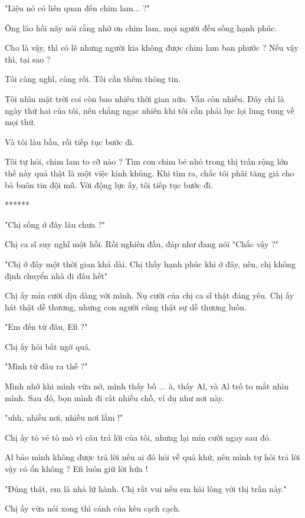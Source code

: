 "Liệu nó có liên quan đến chim lam... ?"

Ông lão hồi nãy nói rằng nhờ ơn chim lam, mọi người đều sống hạnh phúc.

Cho là vậy, thì có lẽ nhưng người kia không được chim lam ban phước ? Nếu vậy thì, tại sao ?

Tôi càng nghĩ, càng rối. Tôi cần thêm thông tin.

Tôi nhìn mặt trời coi còn bao nhiêu thời gian nữa. Vẫn còn nhiều. Đây chỉ là ngày thứ hai của tôi, nên chẳng ngạc nhiên khi tôi cần phải lục lọi lung tung về mọi thứ.

Và tôi làu bầu, rồi tiếp tục bước đi.

Tôi tự hỏi, chim lam to cỡ nào ? Tìm con chim bé nhỏ trong thị trấn rộng lớn thế này quả thật là một việc kinh khủng. Khi tìm ra, chắc tôi phải tăng giá cho bà buôn tin đội mũ. Với động lực ấy, tôi tiếp tục bước đi. \\


 \begin{center}
 	******
 \end{center}

"Chị sống ở đây lâu chưa ?"

Chị ca sĩ suy nghĩ một hồi. Rồi nghiên đầu, đáp như đang nói "Chắc vậy ?"

"Chị ở đây một thời gian khá dài. Chị thấy hạnh phúc khi ở đây, nên, chị không định chuyển nhà đi đâu hết"

Chị ấy mỉn cười dịu dàng với mình. Nụ cười của chị ca sĩ thật đáng yêu. Chị ấy hát thật dễ thương, nhưng con người cũng thật sự dễ thương luôn.

"Em đến từ đâu, Efi ?"

Chị ấy hỏi bất ngờ quá.

"Mình từ đâu ra thế ?"

Mình nhớ khi mình vừa nở, mình thấy bố ... à, thấy Al, và Al trố to mắt nhìn mình. Sau đó, bọn mình đi rất nhiều chỗ, ví dụ như nơi này.

"uhh, nhiều nơi, nhiều nơi lắm !"

Chị ấy tỏ vẻ tò mò vì câu trả lời của tôi, nhưng lại mỉn cười ngay sau đó. 

Al bảo mình không được trả lời nếu ai đó hỏi về quá khứ, nên mình tự hỏi trả lời vậy có ổn không ? Efi luôn giữ lời hứa !

"Đúng thật, em là nhà lữ hành. Chị rất vui nếu em hài lòng với thị trấn này."

Chị ấy vừa nói xong thì cánh của kêu cạch cạch.

